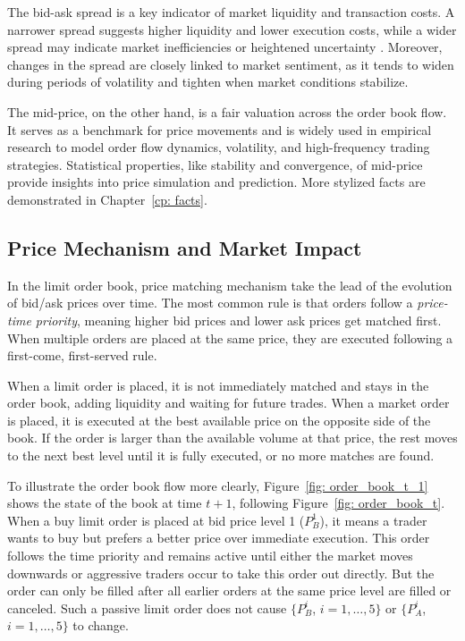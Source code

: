 The bid-ask spread is a key indicator of market liquidity and transaction costs. A narrower spread suggests higher liquidity and lower execution costs, while a wider spread may indicate market inefficiencies or heightened uncertainty \citep{GLOSTEN198571}. Moreover, changes in the spread are closely linked to market sentiment, as it tends to widen during periods of volatility and tighten when market conditions stabilize.

The mid-price, on the other hand, is a fair valuation across the order book flow. It serves as a benchmark for price movements and is widely used in empirical research to model order flow dynamics, volatility, and high-frequency trading strategies. Statistical properties, like stability and convergence, of mid-price provide insights into price simulation and prediction. More stylized facts are demonstrated in Chapter~\ref{cp: facts}. 

\subsection{Price Mechanism and Market Impact}
In the limit order book, price matching mechanism take the lead of the evolution of bid/ask prices over time. The most common rule is that orders follow a \textit{price-time priority}, meaning higher bid prices and lower ask prices get matched first. When multiple orders are placed at the same price, they are executed following a first-come, first-served rule. 

When a limit order is placed, it is not immediately matched and stays in the order book, adding liquidity and waiting for future trades. When a market order is placed, it is executed at the best available price on the opposite side of the book. If the order is larger than the available volume at that price, the rest moves to the next best level until it is fully executed, or no more matches are found. 

To illustrate the order book flow more clearly, Figure~\ref{fig: order_book_t_1} shows the state of the book at time $t+1$, following Figure~\ref{fig: order_book_t}. When a buy limit order is placed at bid price level 1 ($P_B^1$), it means a trader wants to buy but prefers a better price over immediate execution. This order follows the time priority and remains active until either the market moves downwards or aggressive traders occur to take this order out directly. But the order can only be filled after all earlier orders at the same price level are filled or canceled. Such a passive limit order does not cause $\{P_B ^ {i}$, $i = 1, \dots, 5\}$ or $\{P_A ^ {i}$, $i = 1, \dots, 5\}$ to change. 


